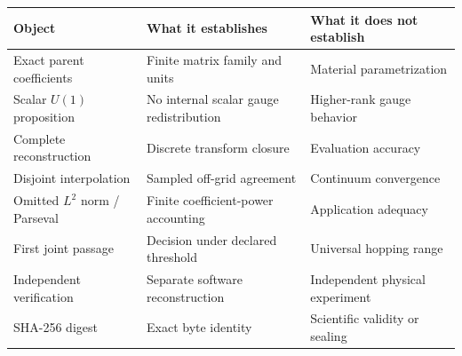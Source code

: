 \documentclass[11pt]{article}
\begin{document}
\begin{center}
\begin{tabular}{p{}p{}p{}}
\toprule
Object & What it establishes & What it does not establish \\
\midrule
Exact parent coefficients & Finite matrix family and units & Material parametrization \\
Scalar $U(1)$ proposition & No internal scalar gauge redistribution & Higher-rank gauge behavior \\
Complete reconstruction & Discrete transform closure & Evaluation accuracy \\
Disjoint interpolation & Sampled off-grid agreement & Continuum convergence \\
Omitted $L^2$ norm / Parseval & Finite coefficient-power accounting & Application adequacy \\
First joint passage & Decision under declared threshold & Universal hopping range \\
Independent verification & Separate software reconstruction & Independent physical experiment \\
SHA-256 digest & Exact byte identity & Scientific validity or sealing \\
\bottomrule
\end{tabular}
\end{center}

\footnotesize


\end{document}
